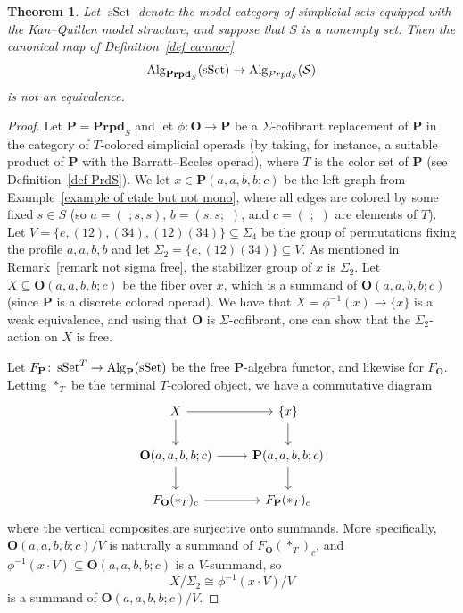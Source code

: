 \documentclass{amsart}
\newtheorem{theorem}{Theorem}
\numberwithin{theorem}{subsection}
\theoremstyle{definition}
\newcommand{\xsSet}{\operatorname{sSet}}
\newcommand{\xS}{\mathcal{S}}
\newcommand{\name}[1]{\ensuremath{\text{\textup{#1}}}}
\newcommand{\Alg}{\name{Alg}}
\newcommand{\calproperad}{\mathcal{P}rpd}
\begin{document}
\begin{theorem}\label{theorem non-rect}
	Let $\xsSet$ denote the model category of simplicial sets equipped with the Kan--Quillen model structure, and suppose that $S$ is a nonempty set. 
	Then the canonical map of Definition~\ref{def canmor}
	\[\Alg_{\mathbf{Prpd}_S}(\xsSet)\to \Alg_{\calproperad_S}(\xS) \] is \emph{not} an equivalence.
\end{theorem}
\begin{proof}
Let $\mathbf{P} = \mathbf{Prpd}_S$ and let $\phi \colon \mathbf{O} \to \mathbf{P}$ be a $\Sigma$-cofibrant replacement of $\mathbf{P}$ in the category of $T$-colored simplicial operads (by taking, for instance, a suitable product of $\mathbf{P}$ with the Barratt--Eccles operad), where $T$ is the color set of $\mathbf{P}$ (see Definition~\ref{def PrdS}).
We let $x \in \mathbf{P}(a,a,b,b;c)$ be the left graph from Example~\ref{example of etale but not mono}, where all edges are colored by some fixed $s\in S$ (so $a = (\,\,; s, s)$, $b=(s,s;\,\,)$, and $c=(\,\,;\,\,)$ are elements of $T$).
Let $V= \{ e, (12), (34), (12)(34) \} \subseteq \Sigma_4$ be the group of permutations fixing the profile $a,a,b,b$ and let $\Sigma_2 = \{e, (12)(34)\} \subseteq V$.
As mentioned in Remark~\ref{remark not sigma free}, the stabilizer group of $x$ is $\Sigma_2$.
Let $X \subseteq \mathbf{O}(a,a,b,b;c)$ be the fiber over $x$, which is a summand of $\mathbf{O}(a,a,b,b;c)$ (since $\mathbf{P}$ is a discrete colored operad).
We have that $X = \phi^{-1}(x) \to \{x\}$ is a weak equivalence, and using that $\mathbf{O}$ is $\Sigma$-cofibrant, one can show that the $\Sigma_2$-action on $X$ is free.

Let $F_{\mathbf{P}} \colon \xsSet^T \to \Alg_{\mathbf{P}}(\xsSet)$ be the free $\mathbf{P}$-algebra functor, and likewise for $F_{\mathbf{O}}$.
Letting $\ast_T$ be the terminal $T$-colored object, we have a commutative diagram
\[ \begin{tikzcd}
X \rar \dar & \{ x\} \dar \\
\mathbf{O}(a,a,b,b;c) \rar \dar & \mathbf{P}(a,a,b,b;c) \dar \\
F_{\mathbf{O}}(\ast_T)_c \rar & F_{\mathbf{P}}(\ast_T)_c
\end{tikzcd} \]
where the vertical composites are surjective onto summands.
More specifically, $\mathbf{O}(a,a,b,b;c) / V$ is naturally a summand of $F_{\mathbf{O}}(\ast_T)_c$, and $\phi^{-1}(x \cdot V) \subseteq \mathbf{O}(a,a,b,b;c)$ is a $V$-summand, so 
\[
	X / \Sigma_2 \cong \phi^{-1}(x \cdot V) / V
\]
is a summand of $\mathbf{O}(a,a,b,b;c) / V$.


\end{proof}
\end{document}
